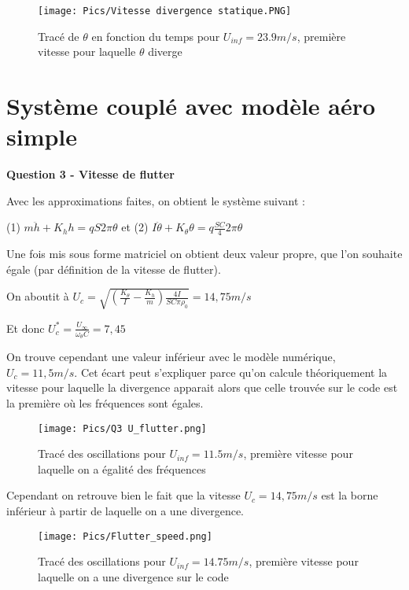 \documentclass[conference]{IEEEtran}
\begin{document}
\begin{figure}[H]
  \texttt{[image: Pics/Vitesse divergence statique.PNG]}
  \caption{Tracé de $\theta$ en fonction du temps pour $U_{inf} = 23.9m/s$, première vitesse pour laquelle $\theta$ diverge}
  \label{fig:boat1}
\end{figure}

\section{Système couplé avec modèle aéro simple}

\textbf{Question 3 - Vitesse de flutter }

Avec les approximations faites, on obtient le système suivant : 
\newline
\begin{center}
    (1) $m \ddot h + K_h h = qS2\pi \theta$ et (2)  $I \ddot \theta + K_\theta \theta = q\frac{SC}{4} 2\pi \theta $
\end{center}


Une fois mis sous forme matriciel on obtient deux valeur propre, que l'on souhaite égale (par définition de la vitesse de flutter). 

On aboutit à $U_c = \sqrt{(\frac{K_\theta}{I}-\frac{K_h}{m})\frac{4I}{SC\pi \rho_0}} = 14,75 m/s$

Et donc $U_c^* =  \frac{U_\infty}{\omega_\theta C} = 7,45$

On trouve cependant une valeur inférieur avec le modèle numérique, $U_c = 11,5m/s$. Cet écart peut s'expliquer parce qu'on calcule théoriquement la vitesse pour laquelle la divergence apparait alors que celle trouvée sur le code est la première où les fréquences sont égales.


\begin{figure}[H]
  \texttt{[image: Pics/Q3 U\_flutter.png]}
  \caption{Tracé des oscillations pour $U_{inf} = 11.5m/s$, première vitesse pour laquelle on a égalité des fréquences}
  \label{fig:boat1}
\end{figure}

Cependant on retrouve bien le fait que la vitesse $U_c = 14,75 m/s$ est la borne inférieur à partir de laquelle on a une divergence. 

\begin{figure}[H]
  \texttt{[image: Pics/Flutter\_speed.png]}
  \caption{Tracé des oscillations pour $U_{inf} = 14.75m/s$, première vitesse pour laquelle on a une divergence sur le code}
  \label{fig:boat1}
\end{figure}
\end{document}
